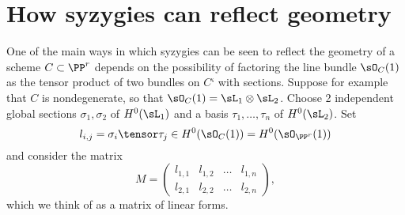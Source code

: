 %
%
%
%
%
%




\section{How syzygies can reflect geometry}\label{syzy and geom}

One of the main ways in which syzygies can be seen to reflect the geometry of a scheme $C\subset \PP^r$
depends on the possibility of factoring the line bundle $\sO_C(1)$ as the tensor product of two bundles on $C$` with sections. Suppose for example that $C$ is nondegenerate, 
so that  $\sO_C(1) = \sL_1\otimes \sL_2$. Choose 2 independent global sections
$\sigma_1, \sigma_2$ of  $H^0(\sL_1)$ and a basis $\tau_1,\dots, \tau_n$ of $H^0(\sL_2)$. Set
$$
l_{i,j}= \sigma_i\tensor \tau_j \in H^0(\sO_C(1)) = H^0(\sO_{\PP^r}(1))
$$ and consider the matrix 
$$
M = 
\begin{pmatrix}
 l_{1,1}&l_{1,2}&\dots&l_{1,n}\\
  l_{2,1}&l_{2,2}&\dots&l_{2,n}
\end{pmatrix},
$$
which we think of as a matrix of linear forms. 

